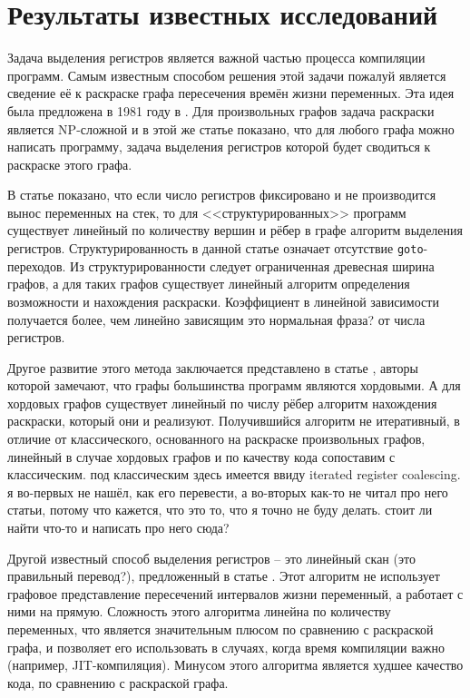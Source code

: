 \documentclass[a4paper,14pt]{extarticle}
\begin{document}
\section{Результаты известных исследований}

Задача выделения регистров является важной частью процесса компиляции программ. Самым известным способом решения этой задачи пожалуй является сведение её к раскраске графа пересечения времён жизни переменных. Эта идея была предложена в 1981 году в \cite{chaitin_register_1981}. Для произвольных графов задача раскраски является NP-сложной и в этой же статье показано, что для любого графа можно написать программу, задача выделения регистров которой будет сводиться к раскраске этого графа.

В статье \cite{hans_l_bodlaender_linear-time_1997} показано, что если число регистров фиксировано и не производится вынос переменных на стек, то для <<структурированных>> программ существует линейный по количеству вершин и рёбер в графе алгоритм выделения регистров. Структурированность в данной статье означает отсутствие \texttt{goto}-переходов. Из структурированности следует ограниченная древесная ширина графов, а для таких графов существует линейный алгоритм определения возможности и нахождения раскраски. Коэффициент в линейной зависимости получается более, чем линейно зависящим {\color{red} это нормальная фраза?} от числа регистров.

Другое развитие этого метода заключается представлено в статье \cite{hutchison_register_2005}, авторы которой замечают, что графы большинства программ являются хордовыми. А для хордовых графов существует линейный по числу рёбер алгоритм нахождения раскраски, который они и реализуют. Получившийся алгоритм не итеративный, в отличие от классического, основанного на раскраске произвольных графов, линейный в случае хордовых графов и по качеству кода сопоставим с классическим. {\color{red} под классическим здесь имеется ввиду iterated register coalescing. я во-первых не нашёл, как его перевести, а во-вторых как-то не читал про него статьи, потому что кажется, что это то, что я точно не буду делать. стоит ли найти что-то и написать про него сюда?}

Другой известный способ выделения регистров -- это линейный скан {\color{red} (это правильный перевод?)}, предложенный в статье \cite{poletto_linear_1999}. Этот алгоритм не использует графовое представление пересечений интервалов жизни переменный, а работает с ними на прямую. Сложность этого алгоритма линейна по количеству переменных, что является значительным плюсом по сравнению с раскраской графа, и позволяет его использовать в случаях, когда время компиляции важно (например, JIT-компиляция). Минусом этого алгоритма является худшее качество кода, по сравнению с раскраской графа.
\end{document}
